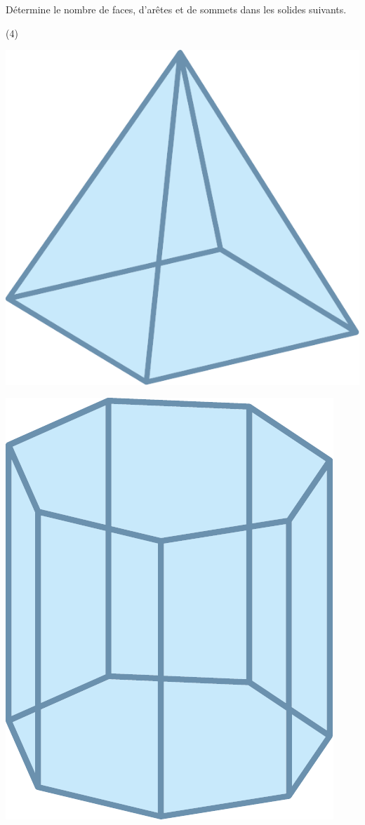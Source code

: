 \documentclass[a4paper,11pt]{report}
\begin{document}
\begin{exop}{
Détermine le nombre de faces, d'arêtes et de sommets dans les solides suivants.	
\begin{tasks}(4)
	\task 

\includegraphics[scale=0.3]{media/es-21/pyra_blue}
\task

\includegraphics[scale=0.3]{media/es-21/prism_hexa_blue}
\task


\end{tasks}}
\end{exop}
\end{document}
